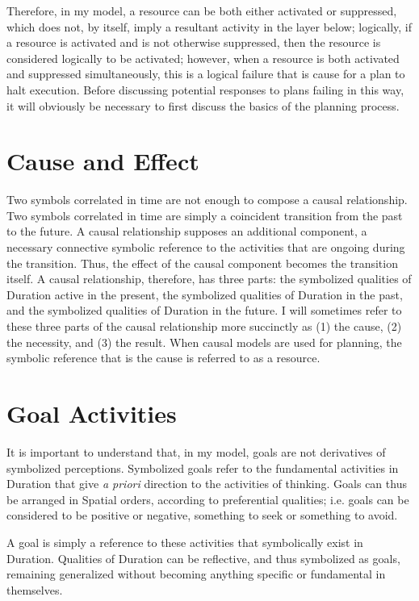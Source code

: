 Therefore, in my model, a resource can be both either activated or
suppressed, which does not, by itself, imply a resultant activity in
the layer below; logically, if a resource is activated and is not
otherwise suppressed, then the resource is considered logically to be
activated; however, when a resource is both activated and suppressed
simultaneously, this is a logical failure that is cause for a plan to
halt execution.  Before discussing potential responses to plans
failing in this way, it will obviously be necessary to first discuss
the basics of the planning process.

\section{Cause and Effect}

Two symbols correlated in time are not enough to compose a causal
relationship.  Two symbols correlated in time are simply a coincident
transition from the past to the future.  A causal relationship
supposes an additional component, a necessary connective symbolic
reference to the activities that are ongoing during the transition.
Thus, the effect of the causal component becomes the transition
itself.  A causal relationship, therefore, has three parts: the
symbolized qualities of Duration active in the present, the symbolized
qualities of Duration in the past, and the symbolized qualities of
Duration in the future.  I will sometimes refer to these three parts
of the causal relationship more succinctly as (1) the cause, (2) the
necessity, and (3) the result.  When causal models are used for
planning, the symbolic reference that is the cause is referred to as a
resource.

\section{Goal Activities}

It is important to understand that, in my model, goals are not
derivatives of symbolized perceptions.  Symbolized goals refer to the
fundamental activities in Duration that give \emph{a priori} direction
to the activities of thinking.  Goals can thus be arranged in Spatial
orders, according to preferential qualities; i.e. goals can be
considered to be positive or negative, something to seek or something
to avoid.

A goal is simply a reference to these activities that symbolically
exist in Duration.  Qualities of Duration can be reflective, and thus
symbolized as goals, remaining generalized without becoming anything
specific or fundamental in themselves.

